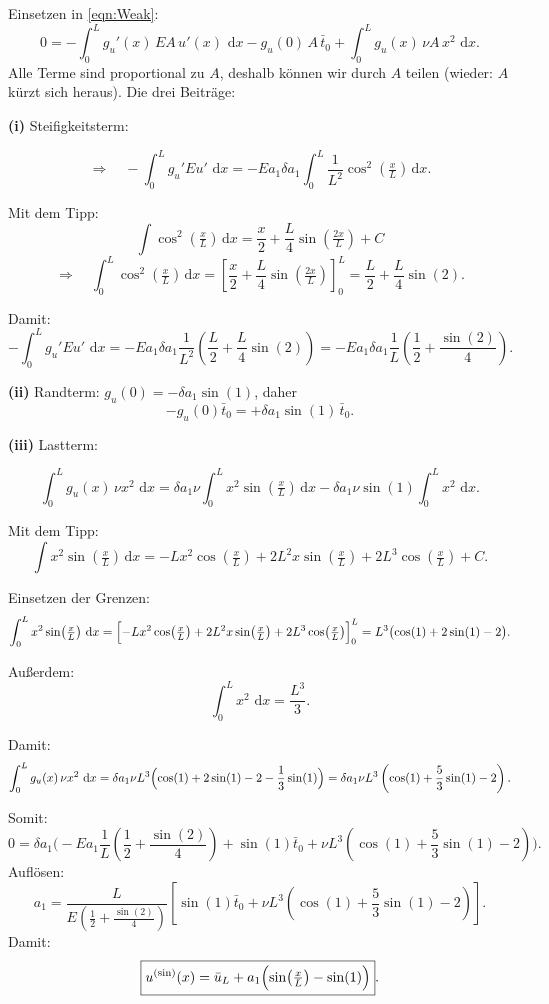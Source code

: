 \documentclass[12pt,a4paper]{article}
\newcommand{\dd}{\,\mathrm d}
\begin{document}
Einsetzen in \eqref{eqn:Weak}:
\[
0=-\int_0^L g_u'(x)\,EA\,u'(x)\,\dd x
-g_u(0)\,A\,\bar t_0
+\int_0^L g_u(x)\,\nu A\,x^2\,\dd x.
\]
Alle Terme sind proportional zu $A$, deshalb können wir durch $A$ teilen (wieder: $A$ kürzt sich heraus).
Die drei Beiträge:

\textbf{(i)} Steifigkeitsterm:

\[
\Rightarrow\quad
-\int_0^L g_u' E u'\,\dd x
=-E a_1\delta a_1\int_0^L \frac{1}{L^2}\cos^2\!\left(\tfrac{x}{L}\right)\dd x.
\]

Mit dem Tipp:
\[
\int \cos^2\!\left(\tfrac{x}{L}\right)\dd x=\frac{x}{2}+\frac{L}{4}\sin\!\left(\tfrac{2x}{L}\right)+C
\]
\[
\Rightarrow\quad
\int_0^L \cos^2\!\left(\tfrac{x}{L}\right)\dd x
=\left[\frac{x}{2}+\frac{L}{4}\sin\!\left(\tfrac{2x}{L}\right)\right]_0^L
=\frac{L}{2}+\frac{L}{4}\sin(2).
\]

Damit:
\[
-\int_0^L g_u' E u'\,\dd x
=-E a_1\delta a_1\frac{1}{L^2}\left(\frac{L}{2}+\frac{L}{4}\sin(2)\right)
=-E a_1\delta a_1\frac{1}{L}\left(\frac12+\frac{\sin(2)}{4}\right).
\]

\textbf{(ii)} Randterm: $g_u(0)=-\delta a_1\sin(1)$, daher
\[
-g_u(0)\bar t_0=+\delta a_1\sin(1)\,\bar t_0.
\]

\textbf{(iii)} Lastterm:

\[
\int_0^L g_u(x)\,\nu x^2\,\dd x
=\delta a_1\nu\!\int_0^L x^2\sin\!\left(\tfrac{x}{L}\right)\dd x
-\delta a_1\nu\sin(1)\!\int_0^L x^2\,\dd x.
\]

Mit dem Tipp:
\[
\int x^2\sin\!\left(\tfrac{x}{L}\right)\dd x
=-Lx^2\cos\!\left(\tfrac{x}{L}\right)
+2L^2x\sin\!\left(\tfrac{x}{L}\right)
+2L^3\cos\!\left(\tfrac{x}{L}\right)+C.
\]

Einsetzen der Grenzen:
\[
\int_0^L x^2\sin\!\left(\tfrac{x}{L}\right)\dd x
=\Bigl[-Lx^2\cos\!\left(\tfrac{x}{L}\right)
+2L^2x\sin\!\left(\tfrac{x}{L}\right)
+2L^3\cos\!\left(\tfrac{x}{L}\right)\Bigr]_0^L
=L^3\bigl(\cos(1)+2\sin(1)-2\bigr).
\]

Außerdem:
\[
\int_0^L x^2\,\dd x=\frac{L^3}{3}.
\]

Damit:
\[
\int_0^L g_u(x)\,\nu x^2\,\dd x
=\delta a_1\nu L^3\Bigl(\cos(1)+2\sin(1)-2-\frac{1}{3}\sin(1)\Bigr)
=\delta a_1\nu L^3\left(\cos(1)+\frac{5}{3}\sin(1)-2\right).
\]

Somit:
\[
0=\delta a_1\Biggl(
-E a_1\frac{1}{L}\left(\frac12+\frac{\sin(2)}{4}\right)
+\sin(1)\bar t_0
+\nu L^3\left(\cos(1)+\frac{5}{3}\sin(1)-2\right)\Biggr).
\]
Auflösen:
\[
\boxed{
a_1=
\frac{L}{E\left(\frac12+\frac{\sin(2)}{4}\right)}
\left[
\sin(1)\bar t_0+\nu L^3\left(\cos(1)+\frac{5}{3}\sin(1)-2\right)
\right]
}.
\]
Damit:
\[
\boxed{
u^{(\sin)}(x)=\bar u_L+a_1\Bigl(\sin\!\left(\tfrac{x}{L}\right)-\sin(1)\Bigr)
}.
\]
\end{document}

